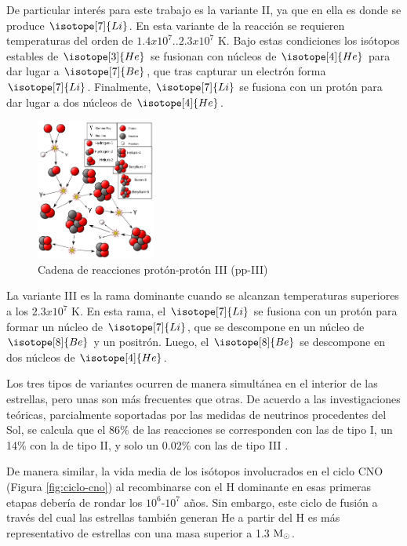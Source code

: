 De particular interés para este trabajo es la variante II, ya que en ella es donde se produce $\isotope[7]{Li}$. En esta variante de la reacción se requieren temperaturas del orden de $1.4x10^7..2.3x10^7$ K. Bajo estas condiciones los isótopos estables de $\isotope[3]{He}$ se fusionan con núcleos de $\isotope[4]{He}$ para dar lugar a $\isotope[7]{Be}$, que tras capturar un electrón forma $\isotope[7]{Li}$. Finalmente, $\isotope[7]{Li}$ se fusiona con un protón para dar lugar a dos núcleos de $\isotope[4]{He}$.\par

\begin{figure}
	\centering
	\includegraphics[width=0.35\textwidth]{img/tesis/pp-III.png}
	\caption {Cadena de reacciones protón-protón III (pp-III)}
	\label{fig:pp-III}
\end{figure}

La variante III es la rama dominante cuando se alcanzan temperaturas superiores a los $2.3x10^7$ K. En esta rama, el $\isotope[7]{Li}$ se fusiona con un protón para formar un núcleo de $\isotope[7]{Li}$, que se descompone en un núcleo de $\isotope[8]{Be}$ y un positrón. Luego, el $\isotope[8]{Be}$ se descompone en dos núcleos de $\isotope[4]{He}$.\par

Los tres tipos de variantes ocurren de manera simultánea en el interior de las estrellas, pero unas son más frecuentes que otras. De acuerdo a las investigaciones teóricas, parcialmente soportadas por las medidas de neutrinos procedentes del Sol, se calcula que el 86\% de las reacciones se corresponden con las de tipo I, un 14\% con la de tipo II, y solo un 0.02\% con las de tipo III \cite{Scholz2018}.\par

De manera similar, la vida media de los isótopos involucrados en el ciclo CNO (Figura \ref{fig:ciclo-cno}) al recombinarse con el H dominante en esas primeras etapas debería de rondar los $10^6$-$10^7$ años. Sin embargo, este ciclo de fusión a través del cual las estrellas también generan He a partir del H es más representativo de estrellas con una masa superior a 1.3 $\mathrm{M}_\odot$.\par


